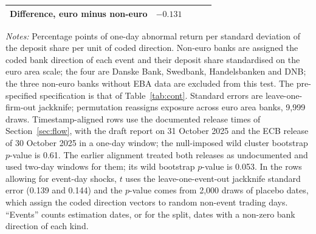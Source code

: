 \documentclass[11pt]{article}
\theoremstyle{plain}\newtheorem{proposition}{Proposition}
\begin{document}
\begin{table}[t]
\begin{threeparttable}
\begin{tabular}{lcccc}
\quad Difference, euro minus non-euro & $-0.131$ & & & \\
\bottomrule
\end{tabular}
\begin{tablenotes}\footnotesize
\item \textit{Notes:} Percentage points of one-day abnormal return per standard deviation of the deposit share per unit of coded direction. Non-euro banks are assigned the coded bank direction of each event and their deposit share standardised on the euro area scale; the four are Danske Bank, Swedbank, Handelsbanken and DNB; the three non-euro banks without EBA data are excluded from this test. The pre-specified specification is that of Table~\ref{tab:cont}. Standard errors are leave-one-firm-out jackknife; permutation reassigns exposure across euro area banks, 9,999 draws. Timestamp-aligned rows use the documented release times of Section~\ref{sec:flow}, with the draft report on 31 October 2025 and the ECB release of 30 October 2025 in a one-day window; the null-imposed wild cluster bootstrap $p$-value is 0.61. The earlier alignment treated both releases as undocumented and used two-day windows for them; its wild bootstrap $p$-value is 0.053. In the rows allowing for event-day shocks, $t$ uses the leave-one-event-out jackknife standard error (0.139 and 0.144) and the $p$-value comes from 2,000 draws of placebo dates, which assign the coded direction vectors to random non-event trading days. ``Events'' counts estimation dates, or for the split, dates with a non-zero bank direction of each kind.
\end{tablenotes}
\end{threeparttable}
\end{table}
\end{document}
